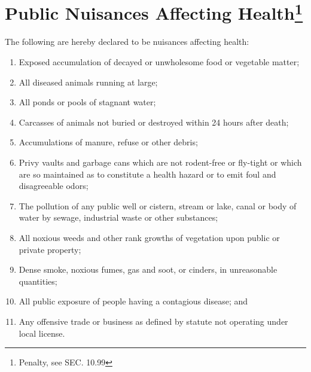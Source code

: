 \section{Public Nuisances Affecting Health\footnote{Penalty, see SEC. 10.99}}
The following are hereby declared to be nuisances affecting health:
\begin{enumerate}[{\indent}A)]
    \item Exposed accumulation of decayed or unwholesome food or vegetable matter;
    \item All diseased animals running at large;
    \item All ponds or pools of stagnant water;
    \item Carcasses of animals not buried or destroyed within 24 hours after death;
    \item Accumulations of manure, refuse or other debris;
    \item Privy vaults and garbage cans which are not rodent-free or fly-tight or which are so maintained as to constitute a health hazard or to emit foul and disagreeable odors;
    \item The pollution of any public well or cistern, stream or lake, canal or body of water by sewage, industrial waste or other substances;
    \item All noxious weeds and other rank growths of vegetation upon public or private property;
    \item Dense smoke, noxious fumes, gas and soot, or cinders, in unreasonable quantities;
    \item All public exposure of people having a contagious disease; and
    \item Any offensive trade or business as defined by statute not operating under local license.
\end{enumerate}
